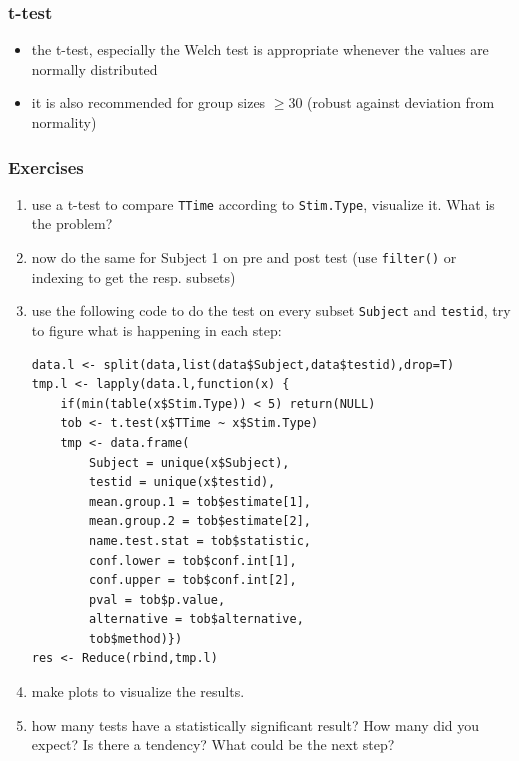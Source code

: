 \documentclass[xcolor={table}]{beamer}
\begin{document}
\begin{frame}[fragile]\frametitle{t-test}
  \begin{itemize}
  \item the t-test, especially the Welch test is appropriate whenever the values are normally distributed
  \item it is also recommended for group sizes $\geq 30$ (robust against deviation from normality)
  \end{itemize}
\end{frame}

\begin{frame}\frametitle{Exercises} 
  \begin{enumerate}
  \item use a t-test to compare \texttt{TTime} according to \texttt{Stim.Type}, visualize it. What is the problem?
  \item now do the same for Subject 1 on pre and post test (use \texttt{filter()} or indexing to get the resp. subsets)
  \item use the following code to do the test on every subset \texttt{Subject} and \texttt{testid}, try to figure what is happening in each step:\tiny
\begin{verbatim}
data.l <- split(data,list(data$Subject,data$testid),drop=T)
tmp.l <- lapply(data.l,function(x) {
    if(min(table(x$Stim.Type)) < 5) return(NULL)
    tob <- t.test(x$TTime ~ x$Stim.Type)
    tmp <- data.frame(
        Subject = unique(x$Subject),
        testid = unique(x$testid),
        mean.group.1 = tob$estimate[1],
        mean.group.2 = tob$estimate[2],
        name.test.stat = tob$statistic,
        conf.lower = tob$conf.int[1],
        conf.upper = tob$conf.int[2],
        pval = tob$p.value,
        alternative = tob$alternative,
        tob$method)})
res <- Reduce(rbind,tmp.l)
\end{verbatim}\normalsize
  \item make plots to visualize the results. 
  \item how many tests have a statistically significant result? How many did you expect? Is there a tendency? What could be the next step?
  \end{enumerate}
\end{frame}
\end{document}
